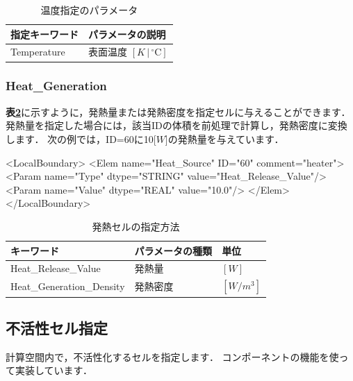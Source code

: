 \begin{table}[htdp]
\caption{温度指定のパラメータ}
\begin{center}
\small
\begin{tabular}{ll} \toprule
指定キーワード & パラメータの説明\\ \midrule
Temperature & 表面温度 $[K\,|\,{}^\circ\mathrm{C}]$\\
\bottomrule
\end{tabular}
\end{center}
\label{tbl:spec temp}
\end{table}

%
\subsubsection{Heat\_Generation}
\textbf{表\ref{tbl:heat_generation}}に示すように，発熱量または発熱密度を指定セルに与えることができます．
発熱量を指定した場合には，該当IDの体積を前処理で計算し，発熱密度に変換します．
次の例では，ID=60に10[$W$]の発熱量を与えています．

{\small
\begin{program}
<LocalBoundary>
  <Elem name="Heat_Source" ID="60" comment="heater">
    <Param name="Type"    dtype="STRING" value="Heat_Release_Value"/>
    <Param name="Value"   dtype="REAL"   value="10.0"/>
  </Elem>
</LocalBoundary>
\end{program}
}

\begin{table}[htdp]
\caption{発熱セルの指定方法}
\begin{center}
\small
\begin{tabular}{lll} \toprule
キーワード & パラメータの種類 & 単位\\ \midrule
Heat\_Release\_Value & 発熱量 & $[W]$\\
Heat\_Generation\_Density & 発熱密度 & $[W/m^3]$\\ \bottomrule
\end{tabular}
\end{center}
\label{tbl:heat_generation}
\end{table}


\subsection{不活性セル指定}

計算空間内で，\hypertarget{tgt:inactive}{不活性化するセル}を指定します．
コンポーネントの機能を使って実装しています．
\vspace{2mm}

